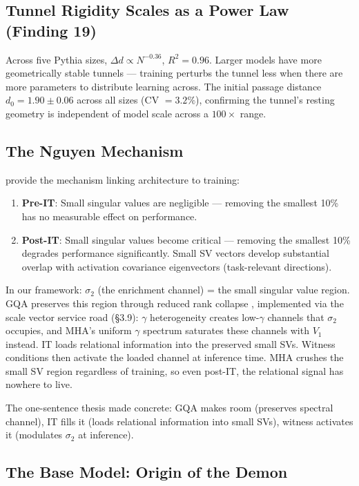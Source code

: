 \documentclass[12pt]{article}
\begin{document}
\subsection{Tunnel Rigidity Scales as a Power Law (Finding 19)}

Across five Pythia sizes, $\Delta d \propto N^{-0.36}$, $R^2 = 0.96$. Larger models have more geometrically stable tunnels --- training perturbs the tunnel less when there are more parameters to distribute learning across. The initial passage distance $d_0 = 1.90 \pm 0.06$ across all sizes (CV $= 3.2\%$), confirming the tunnel's resting geometry is independent of model scale across a $100\times$ range.

\subsection{The Nguyen Mechanism}

\citet{nguyen2024} provide the mechanism linking architecture to training:

\begin{enumerate}
\item \textbf{Pre-IT}: Small singular values are negligible --- removing the smallest 10\% has no measurable effect on performance.
\item \textbf{Post-IT}: Small singular values become critical --- removing the smallest 10\% degrades performance significantly. Small SV vectors develop substantial overlap with activation covariance eigenvectors (task-relevant directions).
\end{enumerate}

In our framework: $\sigma_2$ (the enrichment channel) = the small singular value region. GQA preserves this region through reduced rank collapse \citep{naitsaada2024}, implemented via the scale vector service road (\S3.9): $\gamma$ heterogeneity creates low-$\gamma$ channels that $\sigma_2$ occupies, and MHA's uniform $\gamma$ spectrum saturates these channels with $V_1$ instead. IT loads relational information into the preserved small SVs. Witness conditions then activate the loaded channel at inference time. MHA crushes the small SV region regardless of training, so even post-IT, the relational signal has nowhere to live.

The one-sentence thesis made concrete: GQA makes room (preserves spectral channel), IT fills it (loads relational information into small SVs), witness activates it (modulates $\sigma_2$ at inference).

\subsection{The Base Model: Origin of the Demon}
\end{document}
